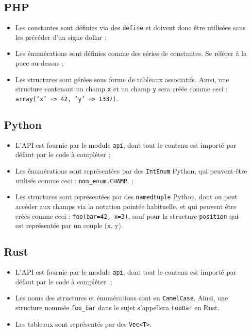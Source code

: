 \subsection{PHP}

\begin{itemize}
\item{Les constantes sont définies via des \texttt{define} et doivent donc être
      utilisées sans les précéder d'un signe dollar ;}
\item{Les énumérations sont définies comme des séries de constantes. Se référer
      à la puce au-dessus ;}
\item{Les structures sont gérées sous forme de tableaux associatifs. Ainsi, une
      structure contenant un champ \texttt{x} et un champ \texttt{y} sera créée
      comme ceci : \texttt{array('x' => 42, 'y' => 1337)}.}
\end{itemize}

\subsection{Python}

\begin{itemize}
\item{L'API est fournie par le module \texttt{api}, dont tout le contenu est
      importé par défaut par le code à compléter ;}
\item{Les énumérations sont représentées par des \texttt{IntEnum} Python, qui
    peuvent-être utilisés comme ceci : \texttt{nom\_enum.CHAMP}. ;}
\item{Les structures sont représentées par des \texttt{namedtuple} Python, dont
      on peut accéder aux champs via la notation pointée habituelle, et
      qui peuvent être créés comme ceci : \texttt{foo(bar=42, x=3)}, sauf pour
      la structure \texttt{position} qui est représentée par un couple (x, y).}
\end{itemize}

\subsection{Rust}

\begin{itemize}
\item{L'API est fournie par le module \texttt{api}, dont tout le contenu est
      importé par défaut par le code à compléter. ;}
\item{Les noms des structures et énumérations sont en \texttt{CamelCase}.
      Ainsi, une structure nommée \texttt{foo\_bar} dans le sujet
      s'appellera \texttt{FooBar} en Rust.}
\item{Les tableaux sont représentés par des \texttt{Vec<T>}.}
\end{itemize}
